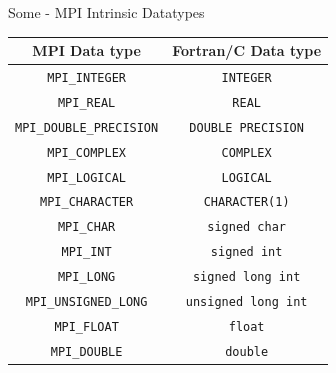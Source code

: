\documentclass[aspectratio=43]{beamer}
\begin{document}
\begin{frame}[fragile]{Some - MPI Intrinsic Datatypes}
\begin{center}
\begin{tabular}{|c||c|}
    \hline
    \color{cscsblue}\textbf{MPI Data type} & \color{cscsbrown}\textbf{Fortran/C Data type} \\\hline\hline
    \verb+MPI_INTEGER+ & \verb+INTEGER+ \\\hline
    \verb+MPI_REAL+ & \verb+REAL+ \\\hline
    \verb+MPI_DOUBLE_PRECISION+ & \verb+DOUBLE PRECISION+ \\\hline
    \verb+MPI_COMPLEX+ & \verb+COMPLEX+ \\\hline
    \verb+MPI_LOGICAL+ & \verb+LOGICAL+ \\\hline
    \verb+MPI_CHARACTER+ & \verb+CHARACTER(1)+ \\\hline\hline
    \verb+MPI_CHAR+ & \verb+signed char+\\\hline
    \verb+MPI_INT+ & \verb+signed int+\\\hline
    \verb+MPI_LONG+ & \verb+signed long int+\\\hline
    \verb+MPI_UNSIGNED_LONG+ & \verb+unsigned long int+\\\hline
    \verb+MPI_FLOAT+ & \verb+float+\\\hline
    \verb+MPI_DOUBLE+ & \verb+double+\\\hline
\end{tabular}
\end{center}
\end{frame}
\end{document}

